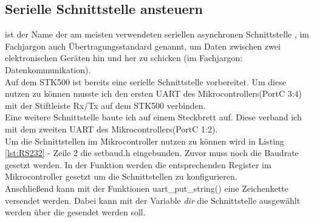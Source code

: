 \lstset{language=C, basicstyle=\footnotesize, showstringspaces=false, tabsize=8}


\subsection{Serielle Schnittstelle ansteuern}	
 ist der Name der am meisten verwendeten seriellen asynchronen Schnittstelle , im Fachjargon auch Übertragungsstandard genannt, um Daten zwischen zwei elektronischen Geräten hin und her zu schicken (im Fachjargon: Datenkommunikation).\cite{uC:rs232}\\
Auf dem STK500 ist bereits eine serielle Schnittstelle vorbereitet. Um diese nutzen zu können musste ich den ersten UART des Mikrocontrollers(PortC 3:4) mit der Stiftleiste Rx/Tx auf dem STK500 verbinden.\\
Eine weitere Schnittstelle baute ich auf einem Steckbrett auf. Diese verband ich mit dem zweiten UART des Mikrocontrollers(PortC 1:2).\\
Um die Schnittstellen im Mikrocontroller nutzen zu können wird in Listing \ref{lst:RS232} - Zeile 2 die setbaud.h eingebunden. Zuvor muss noch die Baudrate gesetzt werden.
In der Funktion  werden die entsprechenden Register im Mikrocontroller gesetzt um die Schnittstellen zu konfigurieren.\\
Anschließend kann mit der Funktionen uart\_put\_string() eine Zeichenkette versendet werden. Dabei kann mit der Variable \emph{dir} die Schnittstelle ausgewählt werden über die gesendet werden soll.
\lstset{language=C, basicstyle=\footnotesize, showstringspaces=false, tabsize=8}


